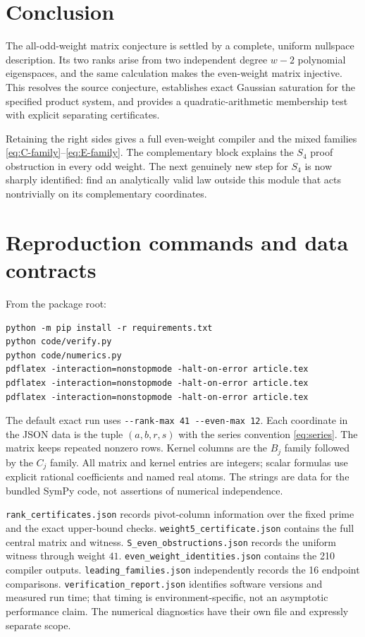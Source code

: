 \documentclass[11pt,a4paper]{article}
\numberwithin{equation}{section}
\theoremstyle{definition}\newtheorem{definition}[theorem]{Definition}
\theoremstyle{remark}\newtheorem{remark}[theorem]{Remark}
\newcommand{\pathtext}[1]{\nolinkurl{#1}}
\begin{document}
\section{Conclusion}
The all-odd-weight matrix conjecture is settled by a complete, uniform
nullspace description. Its two ranks arise from two independent degree
$w-2$ polynomial eigenspaces, and the same calculation makes the even-weight
matrix injective. This resolves the source conjecture, establishes exact
Gaussian saturation for the specified product system, and provides a
quadratic-arithmetic membership test with explicit separating certificates.

Retaining the right sides gives a full even-weight compiler and the mixed
families \eqref{eq:C-family}--\eqref{eq:E-family}. The complementary block
explains the $S_4$ proof obstruction in every odd weight. The next genuinely
new step for $S_4$ is now sharply identified: find an analytically valid law
outside this module that acts nontrivially on its complementary coordinates.

\appendix
\section{Reproduction commands and data contracts}
\label{app:reproduction}
From the package root:
\begin{verbatim}
python -m pip install -r requirements.txt
python code/verify.py
python code/numerics.py
pdflatex -interaction=nonstopmode -halt-on-error article.tex
pdflatex -interaction=nonstopmode -halt-on-error article.tex
pdflatex -interaction=nonstopmode -halt-on-error article.tex
\end{verbatim}
The default exact run uses \pathtext{--rank-max 41 --even-max 12}.
Each coordinate in the JSON data is the tuple $(a,b,r,s)$ with the series
convention \eqref{eq:series}. The matrix keeps repeated nonzero rows. Kernel
columns are the $B_j$ family followed by the $C_j$ family. All matrix and
kernel entries are integers; scalar formulas use explicit rational
coefficients and named real atoms. The strings are data for the bundled
SymPy code, not assertions of numerical independence.

\pathtext{rank_certificates.json} records pivot-column information over the
fixed prime and the exact upper-bound checks.
\pathtext{weight5_certificate.json} contains the full central matrix and
witness. \pathtext{S_even_obstructions.json} records the uniform witness
through weight $41$. \pathtext{even_weight_identities.json} contains the
210 compiler outputs. \pathtext{leading_families.json} independently records
the 16 endpoint comparisons. \pathtext{verification_report.json} identifies
software versions and measured run time; that timing is environment-specific,
not an asymptotic performance claim. The numerical diagnostics have their
own file and expressly separate scope.
\end{document}
